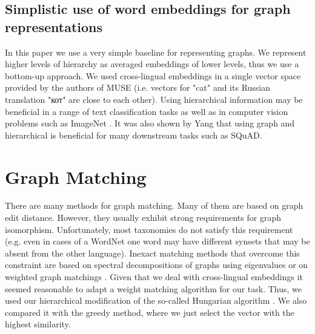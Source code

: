 \documentclass[11pt,a4paper]{article}
\begin{document}
\subsection{Simplistic use of word embeddings for graph representations}
In this paper we use a very simple baseline for representing graphs. We represent higher levels of hierarchy as averaged embeddings of lower levels, thus we use a bottom-up approach. We used cross-lingual embeddings in a single vector space provided by the authors of MUSE (i.e. vectors for "cat" and its Russian translation \foreignlanguage{russian}{"кот"} are close to each other). Using hierarchical information may be beneficial in a range of text classification tasks \cite{tax2vec} as well as in computer vision problems such as ImageNet \cite{hedging-bets}. It was also shown by Yang \citeyearpar{glomo} that using graph and hierarchical is beneficial for many downstream tasks such as SQuAD.


\section{Graph Matching}
There are many methods for graph matching. Many of them are based on graph edit distance. However, they usually exhibit strong requirements for graph isomorphism. Unfortunately, most taxonomies do not satisfy this requirement (e.g. even in cases of a WordNet one word may have different synsets that may be absent from the other language). Inexact matching methods that overcome this constraint are based on spectral decompositions of graphs using eigenvalues or on weighted graph matchings \cite{30years-graphs}. Given that we deal with cross-lingual embeddings it seemed reasonable to adapt a weight matching algorithm for our task. Thus, we used our hierarchical modification of the so-called Hungarian algorithm \cite[p.~201]{lawler} \cite[p.~48]{Riesen2010}. We also compared it with the greedy method, where we just select the vector with the highest similarity.
\end{document}
